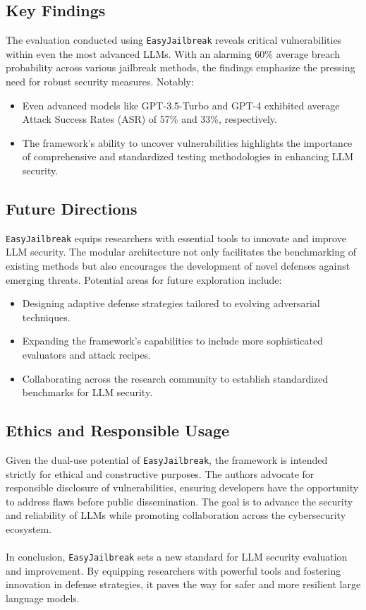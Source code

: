 \documentclass[18pt]{article}
\begin{document}
\subsection*{Key Findings}
The evaluation conducted using \texttt{EasyJailbreak} reveals critical vulnerabilities within even the most advanced LLMs. With an alarming 60\% average breach probability across various jailbreak methods, the findings emphasize the pressing need for robust security measures. Notably:
\begin{itemize}
    \item Even advanced models like GPT-3.5-Turbo and GPT-4 exhibited average Attack Success Rates (ASR) of 57\% and 33\%, respectively.
    \item The framework's ability to uncover vulnerabilities highlights the importance of comprehensive and standardized testing methodologies in enhancing LLM security.
\end{itemize}

\subsection*{Future Directions}
\texttt{EasyJailbreak} equips researchers with essential tools to innovate and improve LLM security. The modular architecture not only facilitates the benchmarking of existing methods but also encourages the development of novel defenses against emerging threats. Potential areas for future exploration include:
\begin{itemize}
    \item Designing adaptive defense strategies tailored to evolving adversarial techniques.
    \item Expanding the framework's capabilities to include more sophisticated evaluators and attack recipes.
    \item Collaborating across the research community to establish standardized benchmarks for LLM security.
\end{itemize}

\subsection*{Ethics and Responsible Usage}
Given the dual-use potential of \texttt{EasyJailbreak}, the framework is intended strictly for ethical and constructive purposes. The authors advocate for responsible disclosure of vulnerabilities, ensuring developers have the opportunity to address flaws before public dissemination. The goal is to advance the security and reliability of LLMs while promoting collaboration across the cybersecurity ecosystem.
\\  \\
In conclusion, \texttt{EasyJailbreak} sets a new standard for LLM security evaluation and improvement. By equipping researchers with powerful tools and fostering innovation in defense strategies, it paves the way for safer and more resilient large language models.

% 
% 
\printbibliography
\end{document}
